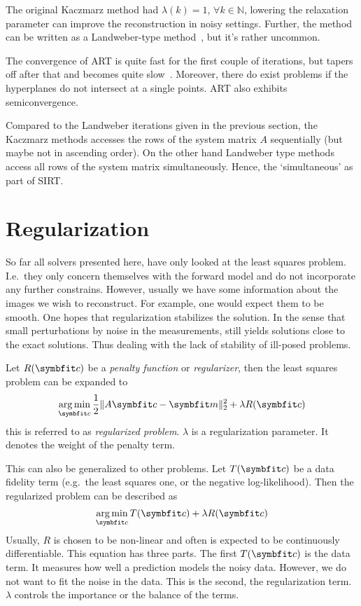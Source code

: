 The original Kaczmarz method had \(\lambda(k) = 1\), \(\forall k \in \mathbb{N}\), lowering the
relaxation parameter can improve the reconstruction in noisy settings. Further, the method can be
written as a Landweber-type method~\cite{hansen_discrete_2010}, but it's rather uncommon.

The convergence of \gls{ART} is quite fast for the first couple of iterations, but tapers off after
that and becomes quite slow~\cite{hansen_discrete_2010}. Moreover, there do exist problems if the
hyperplanes do not intersect at a single points. \gls{ART} also exhibits semiconvergence.

Compared to the Landweber iterations given in the previous section, the Kaczmarz methods accesses
the rows of the system matrix \(A\) sequentially (but maybe not in ascending order). On the other
hand Landweber type methods access all rows of the system matrix simultaneously. Hence, the
`simultaneous' as part of \gls{SIRT}\@.

\section{Regularization}\label{sec:regularization}

So far all solvers presented here, have only looked at the least squares problem. I.e.\ they only
concern themselves with the forward model and do not incorporate any further constrains. However,
usually we have some information about the images we wish to reconstruct. For example, one would
expect them to be smooth. One hopes that regularization stabilizes the solution. In the sense that
small perturbations by noise in the measurements, still yields solutions close to the exact
solutions. Thus dealing with the lack of stability of ill-posed problems.

\begin{definition}\label{def:regularized_problem}
	Let \(R(\mvec{c})\) be a \textit{penalty function} or \textit{regularizer}, then the least
	squares problem can be expanded to
	\[
		\argmin_{\mvec{c}} \frac{1}{2} \norm{A \mvec{c} - \mvec{m}}_2^2 + \lambda R(\mvec{c})
	\]
	this is referred to as \textit{regularized problem}. \(\lambda\) is a regularization
	parameter. It denotes the weight of the penalty term.
\end{definition}

This can also be generalized to other problems. Let \(T(\mvec{c})\) be a data fidelity term (e.g.\
the least squares one, or the negative log-likelihood). Then the regularized problem can be
described as
\begin{equation}\label{eq:optimization_problem}
	\argmin_{\mvec{c}} T(\mvec{c}) + \lambda R(\mvec{c})
\end{equation}
Usually, \(R\) is chosen to be non-linear and often is expected to be continuously differentiable.
This equation has three parts. The first \(T(\mvec{c})\) is the data term. It measures how well a
prediction models the noisy data. However, we do not want to fit the noise in the data. This is the
second, the regularization term. \(\lambda\) controls the importance or the balance of the terms.

